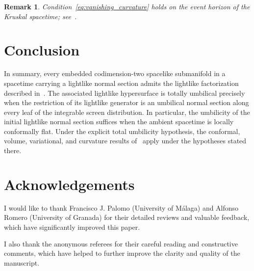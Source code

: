 \documentclass[11pt]{article}
\numberwithin{equation}{section}
\newtheorem{remark}[theorem]{Remark}
\begin{document}
\begin{remark}\normalfont
Condition~\eqref{eq:vanishing_curvature} holds on the event horizon of
the Kruskal spacetime; see~\cite[p.~100]{kupeli}.
\end{remark}
	


	\section*{Conclusion}

	
	In summary, every embedded codimension-two spacelike submanifold in a spacetime carrying a lightlike normal section admits the lightlike factorization described in~. The associated lightlike hypersurface is totally umbilical precisely when the restriction of its lightlike generator is an umbilical normal section along every leaf of the integrable screen distribution. In particular, the umbilicity of the initial lightlike normal section suffices when the ambient spacetime is locally conformally flat. Under the explicit total umbilicity hypothesis, the conformal, volume, variational, and curvature results of~ apply under the hypotheses stated there.
	
	\section*{Acknowledgements}
	I would like to thank Francisco J. Palomo (University of Málaga) and Alfonso Romero (University of Granada) for their detailed reviews and valuable feedback, which have significantly improved this paper. 
	
	I also thank the anonymous referees for their careful reading and constructive comments, which have helped to further improve the clarity and quality of the manuscript.
	
	
\end{document}
